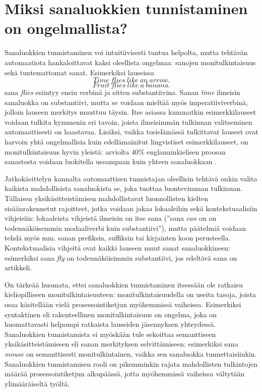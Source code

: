 \documentclass[utf8,bachelor,manualbib]{gradu3}
\begin{document}
\section{Miksi sanaluokkien tunnistaminen on ongelmallista?}

Sanaluokkien tunnistaminen voi intuitiivisesti tuntua helpolta, mutta tehtävän automaatiota hankaloittavat kaksi oleellista ongelmaa: sanojen monitulkintaisuus sekä tuntemattomat sanat. Esimerkiksi lauseissa
\[Time\: flies\: like\: an\: arrow.\]
\[Fruit\: flies\: like\: a\: banana.\]
sana \textit{flies} esiintyy ensin verbinä ja sitten substantiivina. Sanan \textit{time} ilmeisin sanaluokka on substantiivi, mutta se voidaan mieltää myös imperatiiviverbinä, jolloin lauseen merkitys muuttuu täysin. Itse asiassa kummatkin esimerkkilauseet voidaan tulkita kymmenin eri tavoin, joista ilmeisimmän tulkinnan valitseminen automaattisesti on haastavaa. Lisäksi, vaikka tosielämässä tulkittavat lauseet ovat harvoin yhtä ongelmallisia kuin edellämainitut lingvistiset esimerkkilauseet, on monitulkintaisuus hyvin yleistä: arviolta 40\% englanninkielisen proosan sanastosta voidaan luokitella useampaan kuin yhteen sanaluokkaan \citep{derose1988}. 

Jatkokäsittelyn kannalta automaattisen tunnistajan oleellisin tehtävä onkin valita kaikista mahdollisista sanaluokista se, joka tuottaa luontevimman tulkinnan. Tällaisen yksikäsitteistämisen mahdollistavat luonnollisten kielten sisäänrakennetut rajoitteet, jotka voidaan jakaa lokaaleihin sekä kontekstuaalisiin vihjeisiin: lokaaleista vihjeistä ilmeisin on itse sana (''sana \textit{can} on on todennäköisemmin modaaliverbi kuin substantiivi''), mutta päätelmiä voidaan tehdä myös mm. sanan prefiksin, suffiksin tai kirjainten koon perusteella. Kontekstuaalisia vihjeitä ovat kaikki lauseen muut sanat sanaluokkineen: esimerkiksi sana \textit{fly} on todennäköisimmin substantiivi, jos edeltävä sana on artikkeli.

On tärkeää huomata, ettei sanaluokkien tunnistaminen itsessään ole ratkaisu kieliopilliseen monitulkintaisuuteen: monitulkintaisuudella on useita tasoja, joista osaa käsitellään vielä prosessointiketjun myöhemmissä vaiheissa. Esimerkiksi syntaktinen eli rakenteellinen monitulkintaisuus on ongelma, joka on huomattavasti helpompi ratkaista lauseiden jäsennyksen yhteydessä. Sanaluokkien tunnistamista ei myöskään tule sekoittaa semanttiseen yksikäsitteistämiseen eli sanan merkityksen selvittämiseen: esimerkiksi sana \textit{mouse} on semanttisesti monitulkintainen, vaikka sen sanaluokka tunnettaisiinkin. Sanaluokkien tunnistamisen rooli on pikemminkin rajata mahdollisten tulkintojen määrää prosessointiketjun alkupäässä, jotta myöhemmissä vaiheissa vältytään ylimääräiseltä työltä. \citep[s. 341]{manning1999}
\end{document}
